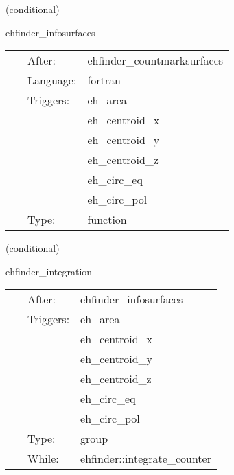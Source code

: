 \vspace{5mm}

   (conditional) 

\hspace{5mm} ehfinder\_infosurfaces 

\hspace{5mm}{\it output info about found surfaces } 


\hspace{5mm}

 \begin{tabular*}{160mm}{cll} 
~ & After:  & ehfinder\_countmarksurfaces \\ 
~ & Language:  & fortran \\ 
~ & Triggers:  & eh\_area \\ 
~& ~ &eh\_centroid\_x\\ 
~& ~ &eh\_centroid\_y\\ 
~& ~ &eh\_centroid\_z\\ 
~& ~ &eh\_circ\_eq\\ 
~& ~ &eh\_circ\_pol\\ 
~ & Type:  & function \\ 
\end{tabular*} 


\vspace{5mm}

   (conditional) 

\hspace{5mm} ehfinder\_integration 

\hspace{5mm}{\it find and integrate over surfaces } 


\hspace{5mm}

 \begin{tabular*}{160mm}{cll} 
~ & After:  & ehfinder\_infosurfaces \\ 
~ & Triggers:  & eh\_area \\ 
~& ~ &eh\_centroid\_x\\ 
~& ~ &eh\_centroid\_y\\ 
~& ~ &eh\_centroid\_z\\ 
~& ~ &eh\_circ\_eq\\ 
~& ~ &eh\_circ\_pol\\ 
~ & Type:  & group \\ 
~ & While:  & ehfinder::integrate\_counter \\ 
\end{tabular*} 


